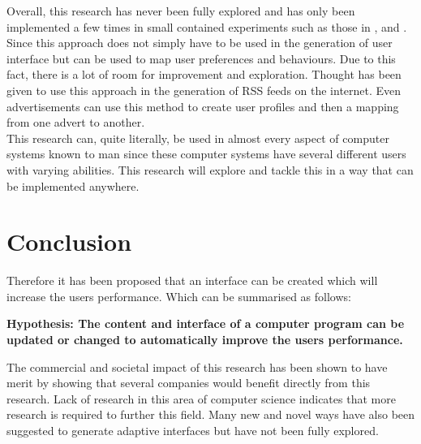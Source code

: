 \documentclass[11pt]{article}
\begin{document}
Overall, this research has never been fully explored and has only been implemented a few times in small contained experiments such as those in \citep{andrade2005challenge}, \citep{ramamoorthylatent} and \citep{rosman2014user}. Since this approach does not simply have to be used in the generation of user interface but can be used to map user preferences and behaviours. Due to this fact, there is a lot of room for improvement and exploration. Thought has been given to use this approach in the generation of RSS feeds on the internet. Even advertisements can use this method to create user profiles and then a mapping from one advert to another. \\
This research can, quite literally, be used in almost every aspect of computer systems known to man since these computer systems have several different users with varying abilities. This research will explore and tackle this in a way that can be implemented anywhere.


\clearpage
\section{Conclusion}

Therefore it has been proposed that an interface can be created which will increase the users performance. Which can be summarised as follows: \\

\begin{center}
\textbf{
Hypothesis: The content and interface of a computer program can be updated or changed to automatically improve the users performance.}
\end{center}

The commercial and societal impact of this research has been shown to have merit by showing that several companies would benefit directly from this research. Lack of research in this area of computer science indicates that more research is required to further this field. Many new and novel ways have also been suggested to generate adaptive interfaces but have not been fully explored.




\clearpage

\end{document}
